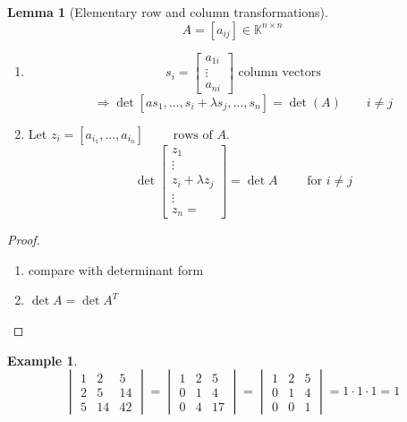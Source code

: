\documentclass[a4paper,landscape,twocolumn]{article}
\theoremstyle{definition}
\newtheorem{ex}{Example}
\newtheorem{lemma}{Lemma}
\begin{document}
\begin{lemma}[Elementary row and column transformations]
  \label{lemma-7.33}
  \[ A = [a_{ij}] \in \mathbb K^{n \times n} \]
  \begin{enumerate}
    \item
      \[ s_i = \begin{bmatrix} a_{1i} \\ \vdots \\ a_{ni }\end{bmatrix} \text{ column vectors} \]
      \[ \Rightarrow \det[as_1, \ldots, s_i + \lambda s_j, \ldots, s_n] = \det(A) \qquad i \neq j \]
    \item
      Let $z_i = [a_{i_1}, \ldots, a_{i_n}] \qquad \text{ rows of $A$}$.
      \[ \det\begin{bmatrix} z_1 \\ \vdots \\ z_i + \lambda z_j \\ \vdots \\ z_n = \end{bmatrix} = \det{A} \qquad \text{ for } i \neq j \]
  \end{enumerate}
\end{lemma}
\begin{proof}
  \begin{enumerate}
    \item compare with determinant form
    \item $\det{A} = \det{A^T}$
  \end{enumerate}
\end{proof}

\begin{ex}
  \label{example-7.34}
  \[
    \begin{vmatrix}
      1 & 2 & 5 \\
      2 & 5 & 14 \\
      5 & 14 & 42
    \end{vmatrix}
    =
    \begin{vmatrix}
      1 & 2 & 5 \\
      0 & 1 & 4 \\
      0 & 4 & 17
    \end{vmatrix}
    =
    \begin{vmatrix}
      1 & 2 & 5 \\
      0 & 1 & 4 \\
      0 & 0 & 1
    \end{vmatrix}
    = 1 \cdot 1 \cdot 1
    = 1
  \]
\end{ex}
\end{document}
